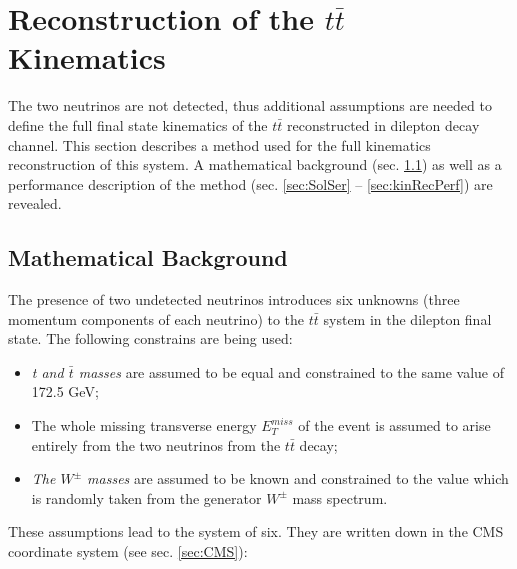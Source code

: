 \chapter{Reconstruction of the $t\bar{t}$ Kinematics}\label{chapt:kinReco}

The two neutrinos are not detected, thus additional
assumptions are needed to define the full final state kinematics of the $t\bar{t}$ reconstructed in dilepton decay channel.
This section describes a method used for the full kinematics reconstruction of this system. A mathematical
background (sec. \ref{sec:MatBg}) as well as a performance description of the method (sec. \ref{sec:SolSer} -- \ref{sec:kinRecPerf}) are revealed.

\section{Mathematical Background}\label{sec:MatBg}

The presence of two undetected neutrinos introduces six unknowns  (three momentum components of each neutrino)
to the $t\bar{t}$ system in the dilepton final state.
The following constrains are being used:

\begin{itemize}
 \item \textit{t and $\bar{t}$ masses} are assumed to be equal and constrained to the same value of 172.5 GeV\cite{PDG-2012};
 \item The whole missing transverse energy $E_{T}^{miss}$ of the event is assumed to arise entirely
 from the two neutrinos from the $t\bar{t}$ decay;
 \item \textit{The $W^{\pm}$ masses} are assumed to be known and constrained to the value which is randomly taken
 from the generator $W^{\pm}$ mass spectrum.
\end{itemize}

These assumptions lead to the system of six.
They are written down in the CMS coordinate system (see sec. \ref{sec:CMS}):

